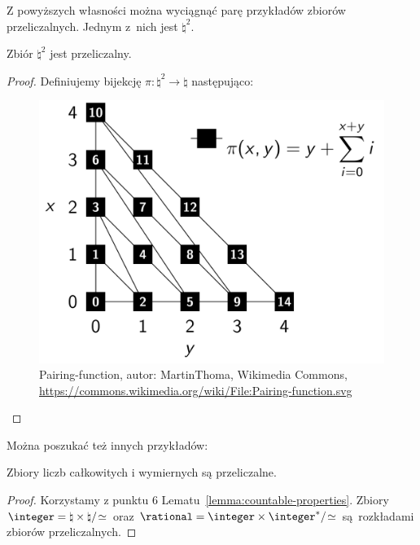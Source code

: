 Z powyższych własności można wyciągnąć parę przykładów zbiorów przeliczalnych. Jednym z~nich jest \( \natural^2 \).
\newpage
\begin{lemma}
    Zbiór \( \natural^2 \) jest przeliczalny.
\end{lemma}
\begin{proof}
    Definiujemy bijekcję \( \pi : \natural^2 \rightarrow \natural \) następująco:
    \begin{figure}[H]
        \centering
        \includegraphics[height=0.5\textwidth]{chapters/mfi/countable/pairing-function}
        \caption{Pairing-function, autor: MartinThoma, Wikimedia Commons, \url{https://commons.wikimedia.org/wiki/File:Pairing-function.svg}}
    \end{figure}
\end{proof}

Można poszukać też innych przykładów:
\begin{lemma}
    Zbiory liczb całkowitych i wymiernych są przeliczalne.
\end{lemma}
\begin{proof}
    Korzystamy z punktu 6 Lematu~\ref{lemma:countable-properties}. Zbiory \( \integer = \natural \times \natural/\!\simeq \) oraz \( \rational = \integer \times \integer^{*}/\!\simeq \) są~rozkładami zbiorów przeliczalnych.
\end{proof}